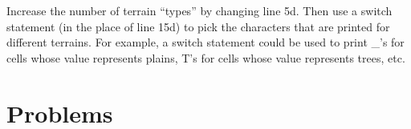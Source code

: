Increase the number of terrain ``types'' by changing line 5d.  Then use a switch statement (in the place of line 15d) to pick the characters that are printed for different terrains.  For example, a switch statement could be used to print \_'s for cells whose value represents plains, T's for cells whose value represents trees, etc.


\section{Problems}

